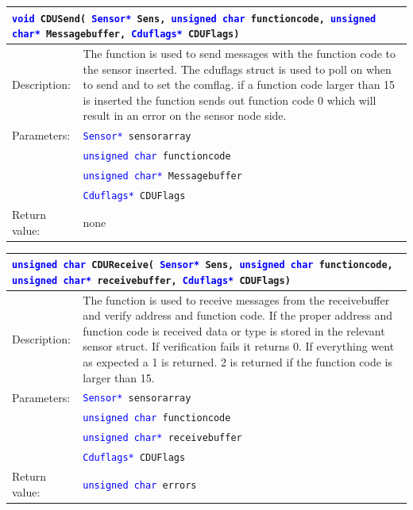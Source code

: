 \begin{table}[H]
\begin{tabular}{l p{12.5cm}}
\multicolumn{2}{p{15cm}}{\texttt{\textcolor{blue}{void} CDUSend( \texttt{\textcolor{blue}{Sensor*} Sens, \textcolor{blue}{unsigned char} functioncode, \textcolor{blue}{unsigned char*} Messagebuffer, \textcolor{blue}{Cduflags*} CDUFlags})}} \\
\hline
Description:& The function is used to send messages with the function code to the sensor inserted. The cduflags struct is used to poll on when to send and to set the comflag. if a function code larger than 15 is inserted the function sends out function code 0 which will result in an error on the sensor node side.\\
Parameters:&\texttt{\textcolor{blue}{Sensor*} sensorarray}\\
&\texttt{\textcolor{blue}{unsigned char} functioncode}\\
&\texttt{\textcolor{blue}{unsigned char*} Messagebuffer}\\
&\texttt{\textcolor{blue}{Cduflags*} CDUFlags}\\
Return value:&none\\
\end{tabular}
\end{table}

\begin{table}[H]
\begin{tabular}{l p{12.5cm}}
\multicolumn{2}{p{15cm}}{\texttt{\textcolor{blue}{unsigned char} CDUReceive( \texttt{\textcolor{blue}{Sensor*} Sens, \textcolor{blue}{unsigned char} functioncode, \textcolor{blue}{unsigned char*} receivebuffer, \textcolor{blue}{Cduflags*} CDUFlags})}} \\
\hline
Description:& The function is used to receive messages from the receivebuffer and verify address and function code. If the proper address and function code is received data or type is stored in the relevant sensor struct. If verification fails it returns 0. If everything went as expected a 1 is returned. 2 is returned if the function code is larger than 15.\\
Parameters:&\texttt{\textcolor{blue}{Sensor*} sensorarray}\\
&\texttt{\textcolor{blue}{unsigned char} functioncode}\\
&\texttt{\textcolor{blue}{unsigned char*} receivebuffer}\\
&\texttt{\textcolor{blue}{Cduflags*} CDUFlags}\\
Return value:&\texttt{\textcolor{blue}{unsigned char} errors}\\
\end{tabular}
\end{table}

